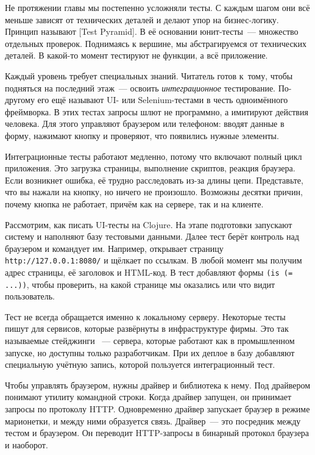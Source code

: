 
Не протяжении главы мы постепенно усложняли тесты. С каждым шагом они всё
меньше зависят от технических деталей и делают упор на бизнес-логику. Принцип
называют [Test Pyramid].
В её основании юнит-тесты~--- множество отдельных проверок. Поднимаясь к вершине,
мы абстрагируемся от технических деталей. В какой-то момент тестируют не функции,
а всё приложение.


Каждый уровень требует специальных знаний. Читатель готов к~тому, чтобы
подняться на последний этаж~--- освоить \emph{интеграционное}
тестирование. По-другому его ещё называют UI- или Selenium-тестами в честь
одноимённого фреймворка. В этих тестах запросы шлют не программно, а имитируют
действия человека. Для этого управляют браузером или телефоном: вводят данные в
форму, нажимают кнопку и проверяют, что появились нужные элементы.

Интеграционные тесты работают медленно, потому что включают полный цикл
приложения. Это загрузка страницы, выполнение скриптов, реакция браузера. Если
возникнет ошибка, её трудно расследовать из-за длины цепи. Представьте, что вы
нажали на кнопку, но ничего не произошло. Возможны десятки причин, почему кнопка
не работает, причём как на сервере, так и на клиенте.

Рассмотрим, как писать UI-тесты на Clojure. На этапе подготовки запускают
систему и наполняют базу тестовыми данными. Далее тест берёт контроль над
браузером и командует им. Например, открывает страницу \verb|http://127.0.0.1:8080/|
и щёлкает по ссылкам. В любой момент мы получим адрес страницы, её заголовок
и HTML-код. В тест добавляют формы \verb|(is (= ...))|, чтобы проверить,
на какой странице мы оказались или что видит пользователь.

Тест не всегда обращается именно к локальному серверу. Некоторые тесты пишут для
сервисов, которые развёрнуты в инфраструктуре фирмы. Это так называемые
стейджинги ~--- сервера, которые работают как в промышленном
запуске, но доступны только разработчикам. При их деплое в базу добавляют
специальную учётную запись, которой пользуется интеграционный тест.

Чтобы управлять браузером, нужны драйвер и библиотека к нему. Под драйвером
понимают утилиту командной строки. Когда драйвер запущен, он принимает запросы
по протоколу HTTP. Одновременно драйвер запускает браузер в режиме марионетки, и
между ними образуется связь. Драйвер~--- это посредник между тестом и браузером. Он
переводит HTTP-запросы в бинарный протокол браузера и наоборот.

